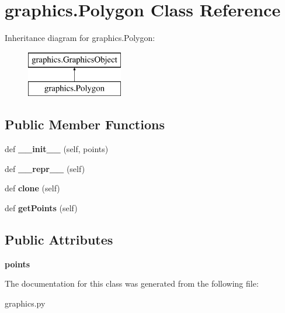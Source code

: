\hypertarget{classgraphics_1_1_polygon}{}\section{graphics.\+Polygon Class Reference}
\label{classgraphics_1_1_polygon}
Inheritance diagram for graphics.\+Polygon\+:\begin{figure}[H]
\begin{center}
\leavevmode
\includegraphics[height=2.000000cm]{classgraphics_1_1_polygon}
\end{center}
\end{figure}
\subsection*{Public Member Functions}
\begin{DoxyCompactItemize}
\item 
def {\bfseries \+\_\+\+\_\+init\+\_\+\+\_\+} (self, points)\hypertarget{classgraphics_1_1_polygon_af9b2f0bcbfecc9d3c2aa5de28c0a3f38}{}\label{classgraphics_1_1_polygon_af9b2f0bcbfecc9d3c2aa5de28c0a3f38}

\item 
def {\bfseries \+\_\+\+\_\+repr\+\_\+\+\_\+} (self)\hypertarget{classgraphics_1_1_polygon_aad12e39fa84c17812be4d1222bf4b33c}{}\label{classgraphics_1_1_polygon_aad12e39fa84c17812be4d1222bf4b33c}

\item 
def {\bfseries clone} (self)\hypertarget{classgraphics_1_1_polygon_aab7a0d81be6f10d4065c9687f5a8b80a}{}\label{classgraphics_1_1_polygon_aab7a0d81be6f10d4065c9687f5a8b80a}

\item 
def {\bfseries get\+Points} (self)\hypertarget{classgraphics_1_1_polygon_a68417042ff193fc01179b274e120d947}{}\label{classgraphics_1_1_polygon_a68417042ff193fc01179b274e120d947}

\end{DoxyCompactItemize}
\subsection*{Public Attributes}
\begin{DoxyCompactItemize}
\item 
{\bfseries points}\hypertarget{classgraphics_1_1_polygon_a3a5ff52b9aef1e15507e2724575da586}{}\label{classgraphics_1_1_polygon_a3a5ff52b9aef1e15507e2724575da586}

\end{DoxyCompactItemize}


The documentation for this class was generated from the following file\+:\begin{DoxyCompactItemize}
\item 
graphics.\+py\end{DoxyCompactItemize}
